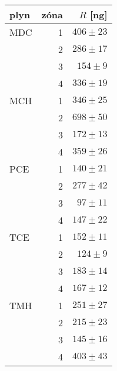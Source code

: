 \begin{tabular}{lrr}
\toprule
plyn & zóna & $R$ [ng]     \\
\midrule
MDC & 1 &  $406\pm23$ \\
    & 2 &  $286\pm17$ \\
    & 3 &  $154\pm9$\\
    & 4 &  $336\pm19$ \\
MCH & 1 &  $346\pm25$ \\
    & 2 &  $698\pm50$ \\
    & 3 &  $172\pm13$ \\
    & 4 &  $359\pm26$ \\
PCE & 1 &  $140\pm21$ \\
    & 2 &  $277\pm42$ \\
    & 3 &  $ 97\pm11$ \\
    & 4 &  $147\pm22$ \\
TCE & 1 &  $152\pm11$ \\
    & 2 &  $124\pm9$\\
    & 3 &  $183\pm14$ \\
    & 4 &  $167\pm12$ \\
TMH & 1 &  $251\pm27$ \\
    & 2 &  $215\pm23$ \\
    & 3 &  $145\pm16$ \\
    & 4 &  $403\pm43$ \\
\bottomrule
\end{tabular}
